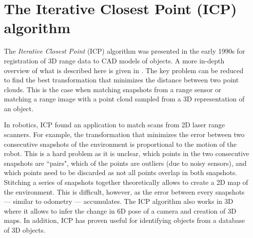 \documentclass[paper=6.14in:9.21in,pagesize=pdftex,11pt,twoside,openright]{scrbook}
\begin{document}
\section{The Iterative Closest Point (ICP) algorithm}
The \emph{Iterative Closest Point} (ICP) algorithm was presented in the early 1990s for registration of 3D range data to CAD models of objects. A more in-depth overview of what is described here is given in \cite{rusinkiewicz01}. The key problem can be reduced to find the best transformation that minimizes the distance between two point clouds. This is the case when matching snapshots from a range sensor or matching a range image with a point cloud sampled from a 3D representation of an object.

In robotics, ICP found an application to match scans from 2D laser range scanners. For example, the transformation that minimizes the error between two consecutive snapshots of the environment is proportional to the motion of the robot. This is a hard problem as it is unclear, which points in the two consecutive snapshots are ``pairs", which of the points are outliers (due to noisy sensors), and which points need to be discarded as not all points overlap in both snapshots. Stitching a series of snapshots together theoretically allows to create a 2D map of the environment. This is difficult, however, as the error between every snapshots --- similar to odometry --- accumulates.   The ICP algorithm also works in 3D where it allows to infer the change in 6D pose of a camera and creation of 3D maps. In addition, ICP has proven useful for identifying objects from a database of 3D objects.
\end{document}
